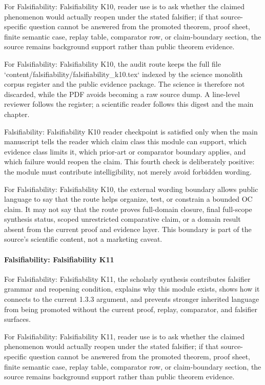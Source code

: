 For Falsifiability: Falsifiability K10, reader use is to ask whether the claimed phenomenon would actually reopen under the stated falsifier; if that source-specific question cannot be answered from the promoted theorem, proof sheet, finite semantic case, replay table, comparator row, or claim-boundary section, the source remains background support rather than public theorem evidence.


For Falsifiability: Falsifiability K10, the audit route keeps the full file `content/falsifiability/falsifiability\_k10.tex` indexed by the science monolith corpus register and the public evidence package. The science is therefore not discarded, while the PDF avoids becoming a raw source dump. A line-level reviewer follows the register; a scientific reader follows this digest and the main chapter.


Falsifiability: Falsifiability K10 reader checkpoint is satisfied only when the main manuscript tells the reader which claim class this module can support, which evidence class limits it, which prior-art or comparator boundary applies, and which failure would reopen the claim. This fourth check is deliberately positive: the module must contribute intelligibility, not merely avoid forbidden wording.


For Falsifiability: Falsifiability K10, the external wording boundary allows public language to say that the route helps organize, test, or constrain a bounded OC claim. It may not say that the route proves full-domain closure, final full-scope synthesis status, scoped unrestricted comparative claim, or a domain result absent from the current proof and evidence layer. This boundary is part of the source's scientific content, not a marketing caveat.


\paragraph{Falsifiability: Falsifiability K11}

For Falsifiability: Falsifiability K11, the scholarly synthesis contributes falsifier grammar and reopening condition, explains why this module exists, shows how it connects to the current 1.3.3 argument, and prevents stronger inherited language from being promoted without the current proof, replay, comparator, and falsifier surfaces.


For Falsifiability: Falsifiability K11, reader use is to ask whether the claimed phenomenon would actually reopen under the stated falsifier; if that source-specific question cannot be answered from the promoted theorem, proof sheet, finite semantic case, replay table, comparator row, or claim-boundary section, the source remains background support rather than public theorem evidence.


